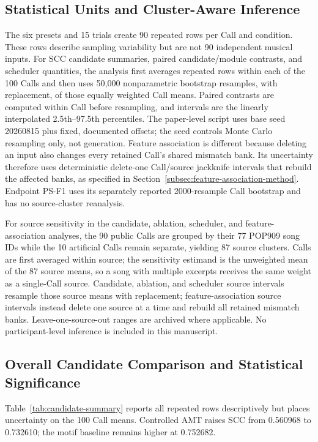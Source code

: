 \documentclass[11pt,a4paper]{article}
\begin{document}
\subsection{Statistical Units and Cluster-Aware Inference}
\label{subsec:statistical-units}

The six presets and 15 trials create 90 repeated rows per Call and condition. These rows describe sampling variability but are not 90 independent musical inputs. For SCC candidate summaries, paired candidate/module contrasts, and scheduler quantities, the analysis first averages repeated rows within each of the 100 Calls and then uses 50,000 nonparametric bootstrap resamples, with replacement, of those equally weighted Call means. Paired contrasts are computed within Call before resampling, and intervals are the linearly interpolated 2.5th--97.5th percentiles. The paper-level script uses base seed 20260815 plus fixed, documented offsets; the seed controls Monte Carlo resampling only, not generation. Feature association is different because deleting an input also changes every retained Call's shared mismatch bank. Its uncertainty therefore uses deterministic delete-one Call/source jackknife intervals that rebuild the affected banks, as specified in Section~\ref{subsec:feature-association-method}. Endpoint PS-F1 uses its separately reported 2000-resample Call bootstrap and has no source-cluster reanalysis.

For source sensitivity in the candidate, ablation, scheduler, and feature-association analyses, the 90 public Calls are grouped by their 77 POP909 song IDs while the 10 artificial Calls remain separate, yielding 87 source clusters. Calls are first averaged within source; the sensitivity estimand is the unweighted mean of the 87 source means, so a song with multiple excerpts receives the same weight as a single-Call source. Candidate, ablation, and scheduler source intervals resample those source means with replacement; feature-association source intervals instead delete one source at a time and rebuild all retained mismatch banks. Leave-one-source-out ranges are archived where applicable. No participant-level inference is included in this manuscript.

\subsection{Overall Candidate Comparison and Statistical Significance}
\label{subsec:overall-comparison}

Table~\ref{tab:candidate-summary} reports all repeated rows descriptively but places uncertainty on the 100 Call means. Controlled AMT raises SCC from 0.560968 to 0.732610; the motif baseline remains higher at 0.752682.
\end{document}

